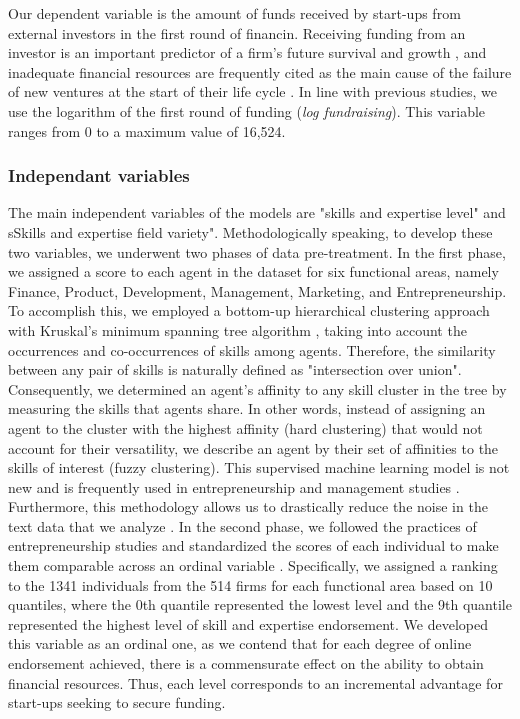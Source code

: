\documentclass[12pt]{article}
\begin{document}
Our dependent variable is the amount of funds received by start-ups from external investors in the first round of financin. Receiving funding from an investor is an important predictor of a firm's future survival and growth \citep{beckman2007early}, and inadequate financial resources are frequently cited as the main cause of the failure of new ventures at the start of their life cycle \citep{franke2008venture, eddleston2016you}. In line with previous studies, we use the logarithm of the first round of funding (\textit{log fundraising}). This variable ranges from 0 to a maximum value of 16,524.

\subsubsection{Independant variables}

The main independent variables of the models are "skills and expertise level" and sSkills and expertise field variety". Methodologically speaking, to develop these two variables, we underwent two phases of data pre-treatment. In the first phase, we assigned a score to each agent in the dataset for six functional areas, namely Finance, Product, Development, Management, Marketing, and Entrepreneurship. To accomplish this, we employed a bottom-up hierarchical clustering approach with Kruskal's minimum spanning tree algorithm \citep{kruskal1956shortest}, taking into account the occurrences and co-occurrences of skills among agents. Therefore, the similarity between any pair of skills is naturally defined as "intersection over union". Consequently, we determined an agent's affinity to any skill cluster in the tree by measuring the skills that agents share. In other words, instead of assigning an agent to the cluster with the highest affinity (hard clustering) that would not account for their versatility, we describe an agent by their set of affinities to the skills of interest (fuzzy clustering). This supervised machine learning model is not new and is frequently used in entrepreneurship and management studies \citep{kaushal2021artificial}. Furthermore, this methodology allows us to drastically reduce the noise in the text data that we analyze \citep{wu2018analysis}. In the second phase, we followed the practices of entrepreneurship studies and standardized the scores of each individual to make them comparable across an ordinal variable \citep{harrison2007s}. Specifically, we assigned a ranking to the 1341 individuals from the 514 firms for each functional area based on 10 quantiles, where the 0th quantile represented the lowest level and the 9th quantile represented the highest level of skill and expertise endorsement. We developed this variable as an ordinal one, as we contend that for each degree of online endorsement achieved, there is a commensurate effect on the ability to obtain financial resources. Thus, each level corresponds to an incremental advantage for start-ups seeking to secure funding.
\end{document}
